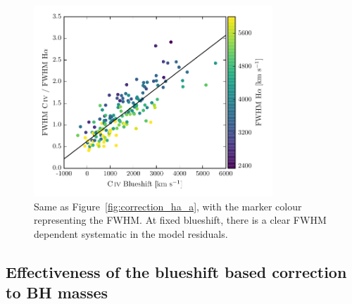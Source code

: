 \begin{figure}
    \centering 
    \includegraphics[width=0.8\textwidth]{figures/chapter03/fwhm_correction_color.pdf}  
    \caption[{Same as Figure~\ref{fig:correction_ha_a}, with the marker colour representing the \ha FWHM.}]{Same as Figure~\ref{fig:correction_ha_a}, with the marker colour representing the \ha FWHM. At fixed  blueshift, there is a clear \ha FWHM dependent systematic in the model residuals.}   
    \label{fig:residuals_ha_fwhm}
\end{figure}

\subsection{Effectiveness of the  blueshift based correction to BH masses}
\label{sec:effectiveness}

